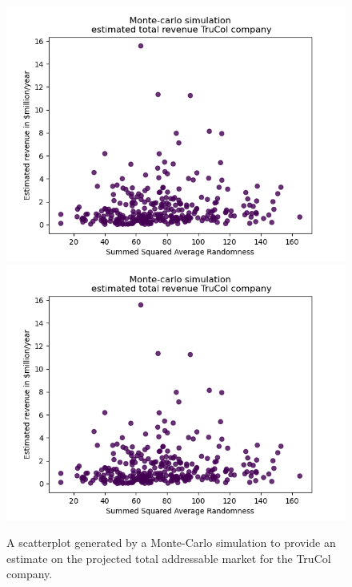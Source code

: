 \begin{figure}[H]
    \centering
    \ifx\homepath\overleafhome
    \includegraphics[width=0.5\linewidth]{Images/revenue_sum.png}
	\else
    \includegraphics[width=0.5\linewidth]{latex/Images/revenue_sum.png}
	\fi

    \caption{A scatterplot generated by a Monte-Carlo simulation to provide an estimate on the projected total addressable market for the TruCol company.}
    \label{fig:summed}
\end{figure}
